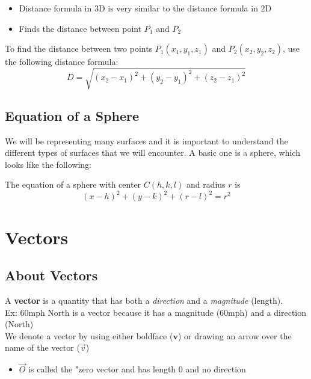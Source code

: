\documentclass{package/notes}
\begin{document}
\begin{itemize}
	\item Distance formula in 3D is very similar to the distance formula in 2D
	\item Finds the distance between point $P_1$ and $P_2$ 
\end{itemize}

\begin{definition}
	To find the distance between two points $P_1(x_1, y_1, z_1)$ and $P_2(x_2,y_2,z_2)$, use the following distance formula:
	$$D = \sqrt{(x_2-x_1)^2 + (y_2-y_1)^2 + (z_2-z_1)^2}$$
\end{definition}

\subsection{Equation of a Sphere}
We will be representing many surfaces and it is important to understand the different types of surfaces that we will encounter. A basic one is a sphere, which looks like the following:
\begin{proposition}
	The equation of a sphere with center $C(h,k,l)$ and radius $r$ is
	$$(x-h)^2 + (y-k)^2 + (r-l)^2 = r^2$$
\end{proposition}


\section{Vectors}

\subsection{About Vectors}

\begin{definition}
	A \textbf{vector} is a quantity that has both a \textit{direction} and a \textit{magnitude} (length).\\

Ex: 60mph North is a vector because it has a magnitude (60mph) and a direction (North)\\

We denote a vector by using either boldface ($\mathbf v$) or drawing an arrow over the name of the vector ($\vec v$)
\end{definition}

\begin{itemize}
	\item $\vec{O}$ is called the "zero vector and has length $0$ and no direction
\end{itemize}
\end{document}
